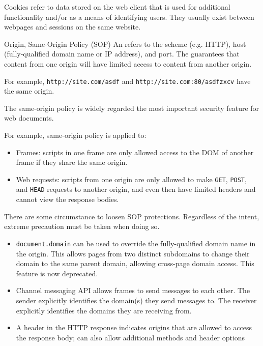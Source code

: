 
\begin{dfnbox}{Cookies}{}
     refer to data stored on the web client that is used for additional functionality and/or as a means of identifying users. They usually exist between webpages and sessions on the same website.
\end{dfnbox}

\begin{dfnbox}{Origin, Same-Origin Policy (SOP)}{}
    An  refers to the scheme (e.g. HTTP), host (fully-qualified domain name or IP address), and port. The  guarantees that content from one origin will have limited access to content from another origin.
\end{dfnbox}

For example, \texttt{http://site.com/asdf} and \texttt{http://site.com:80/asdfzxcv} have the same origin.

\begin{notebox}
 The same-origin policy is widely regarded the most important security feature for web documents.
\end{notebox}

For example, same-origin policy is applied to:
\begin{itemize}
    \item Frames: scripts in one frame are only allowed access to the DOM of another frame if they share the same origin.
    \item Web requests: scripts from one origin are only allowed to make \texttt{GET}, \texttt{POST}, and \texttt{HEAD} requests to another origin, and even then have limited headers and cannot view the response bodies.
\end{itemize}

There are some circumstance to loosen SOP protections. Regardless of the intent, extreme precaution must be taken when doing so.
\begin{itemize}
    \item \texttt{document.domain} can be used to override the fully-qualified domain name in the origin. This allows pages from two distinct subdomains to change their domain to the same parent domain, allowing cross-page domain access. This feature is now deprecated.
    \item Channel messaging API allows frames to send messages to each other. The sender explicitly identifies the domain(s) they send messages to. The receiver explicitly identifies the domains they are receiving from.
    \item {} A header in the HTTP response indicates origins that are allowed to access the response body; can also allow additional methods and header options
\end{itemize}

